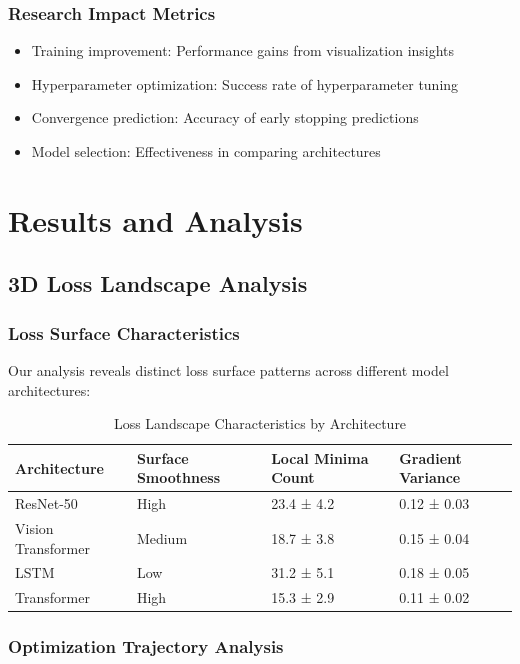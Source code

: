 \documentclass[12pt,a4paper]{article}
\begin{document}
\subsubsection{Research Impact Metrics}

\begin{itemize}
    \item Training improvement: Performance gains from visualization insights
    \item Hyperparameter optimization: Success rate of hyperparameter tuning
    \item Convergence prediction: Accuracy of early stopping predictions
    \item Model selection: Effectiveness in comparing architectures
\end{itemize}

\section{Results and Analysis}
\label{sec:results}

\subsection{3D Loss Landscape Analysis}

\subsubsection{Loss Surface Characteristics}

Our analysis reveals distinct loss surface patterns across different model architectures:

\begin{table}[H]
\centering
\caption{Loss Landscape Characteristics by Architecture}
\label{tab:loss-landscape}
\begin{tabular}{@{}llll@{}}
\toprule
Architecture & Surface Smoothness & Local Minima Count & Gradient Variance \\
\midrule
ResNet-50 & High & 23.4 ± 4.2 & 0.12 ± 0.03 \\
Vision Transformer & Medium & 18.7 ± 3.8 & 0.15 ± 0.04 \\
LSTM & Low & 31.2 ± 5.1 & 0.18 ± 0.05 \\
Transformer & High & 15.3 ± 2.9 & 0.11 ± 0.02 \\
\bottomrule
\end{tabular}
\end{table}

\subsubsection{Optimization Trajectory Analysis}
\end{document}
